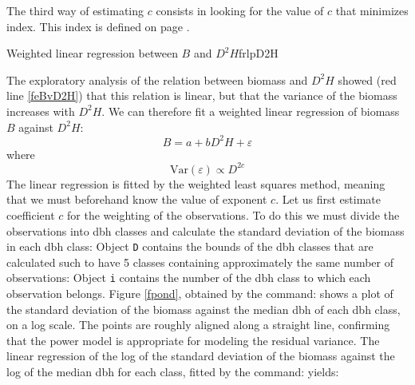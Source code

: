 The third way of estimating $c$ consists in looking for the value of $c$ that minimizes \citet{furnival61} index. This index is defined on page \pageref{furni}.

\begin{filrouge}{Weighted linear regression between $B$ and $D^2H$}{frlpD2H}%

The exploratory analysis of the relation between biomass and $D^2H$ showed (red line \ref{feBvD2H}) that this relation is linear, but that the variance of the biomass increases with $D^2H$. We can therefore fit a weighted linear regression of biomass $B$ against $D^2H$:
\[
B=a+bD^2H+\varepsilon
\]
where
\[
\mathrm{Var}(\varepsilon)\propto D^{2c}
\]
The linear regression is fitted by the weighted least squares method, meaning that we must beforehand know the value of exponent $c$.
Let us first estimate coefficient $c$ for the weighting of the observations. To do this we must divide the observations into dbh classes and calculate the standard deviation of the biomass in each dbh class:
%
Object \texttt{D} contains the bounds of the dbh classes that are calculated such to have 5 classes containing approximately the same number of observations: Object \texttt{i} contains the number of the dbh class to which each observation belongs.  Figure \ref{fpond}, obtained by the command:
%
shows a plot of the standard deviation of the biomass against the median dbh of each dbh class, on a log scale. The points are roughly aligned along a straight line, confirming that the power model is appropriate for modeling the residual variance. The linear regression of the log of the standard deviation of the biomass against the log of the median dbh for each class, fitted by the command:
%
yields:
%

\end{filrouge}
